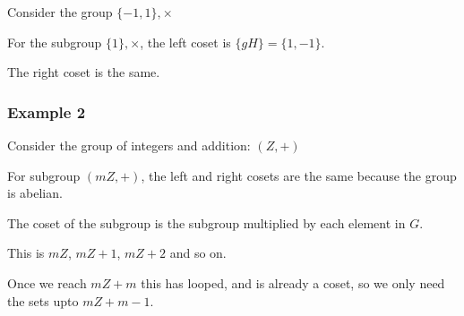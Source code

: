 Consider the group \(\{-1,1\},\times \)

For the subgroup \(\{1\},\times \), the left coset is \(\{gH\}=\{1,-1\}\).

The right coset is the same.

\subsubsection{Example 2}

Consider the group of integers and addition: \((Z,+)\)

For subgroup \((mZ,+)\), the left and right cosets are the same because the group is abelian.

The coset of the subgroup is the subgroup multiplied by each element in \(G\).

This is \(mZ\), \(mZ+1\), \(mZ+2\) and so on.

Once we reach \(mZ+m\) this has looped, and is already a coset, so we only need the sets upto \(mZ+m-1\).

